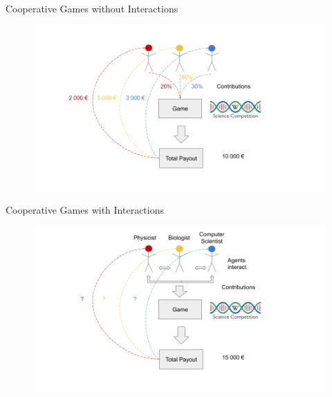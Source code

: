 \documentclass[11pt,compress,t,notes=noshow, aspectratio=169, xcolor=table]{beamer}
\begin{document}
\begin{vbframe}{Cooperative Games without Interactions}

\begin{figure}
    \centering
    \includegraphics{slides/shapley/figure/Shapley_2.png}
\end{figure}

\end{vbframe}
\begin{vbframe}{Cooperative Games with Interactions}

\begin{figure}
    \centering
    \includegraphics{slides/shapley/figure/Shapley_3.png}
\end{figure}

\end{vbframe}
\end{document}
